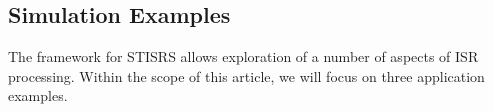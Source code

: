 \documentclass[draft,ras]{agutex}
\begin{document}
\begin{article}
%
%
%
%



\section{Simulation Examples}
The framework for STISRS allows exploration of a number of aspects of ISR processing. Within the scope of this article, we will focus on three application examples.


\end{article}
\end{document}
